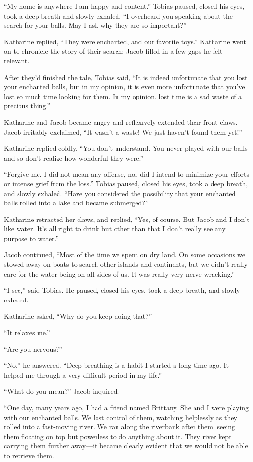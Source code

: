 “My home is anywhere I am happy and content.” Tobias paused, closed his eyes, took a deep breath and slowly exhaled. “I overheard you speaking about the search for your balls. May I ask why they are so important?”

Katharine replied, “They were enchanted, and our favorite toys.” Katharine went on to chronicle the story of their search; Jacob filled in a few gaps he felt relevant.

After they'd finished the tale, Tobias said, “It is indeed unfortunate that you lost your enchanted balls, but in my opinion, it is even more unfortunate that you've lost so much time looking for them. In my opinion, lost time is a sad waste of a precious thing.”

Katharine and Jacob became angry and reflexively extended their front claws. Jacob irritably exclaimed, “It wasn't a waste! We just haven't found them yet!”

Katharine replied coldly, “You don't understand. You never played with our balls and so don't realize how wonderful they were.”

“Forgive me. I did not mean any offense, nor did I intend to minimize your efforts or intense grief from the loss.” Tobias paused, closed his eyes, took a deep breath, and slowly exhaled. “Have you considered the possibility that your enchanted balls rolled into a lake and became submerged?”

Katharine retracted her claws, and replied, “Yes, of course. But Jacob and I don't like water. It's all right to drink but other than that I don't really see any purpose to water.”

Jacob continued, “Most of the time we spent on dry land. On some occasions we stowed away on boats to search other islands and continents, but we didn't really care for the water being on all sides of us. It was really very nerve-wracking.”

“I see,” said Tobias. He paused, closed his eyes, took a deep breath, and slowly exhaled.

Katharine asked, “Why do you keep doing that?”

“It relaxes me.”

“Are you nervous?”

“No,” he answered. “Deep breathing is a habit I started a long time ago. It helped me through a very difficult period in my life.”

“What do you mean?” Jacob inquired.

“One day, many years ago, I had a friend named Brittany. She and I were playing with our enchanted balls. We lost control of them, watching helplessly as they rolled into a fast-moving river. We ran along the riverbank after them, seeing them floating on top but powerless to do anything about it. They river kept carrying them further away—it became clearly evident that we would not be able to retrieve them.

